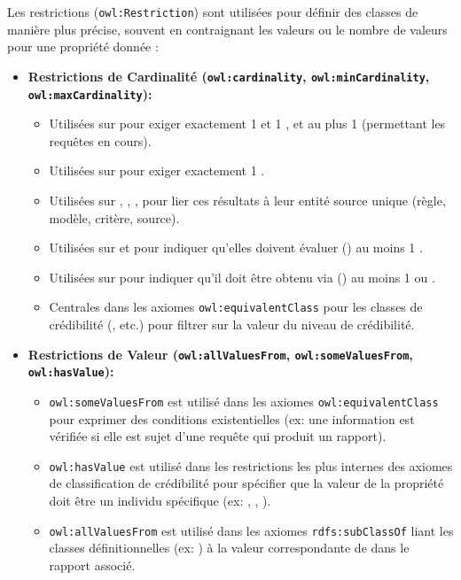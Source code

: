 \documentclass[9pt,twocolumn,twoside,french]{article}
\begin{document}
Les restrictions (\texttt{owl:Restriction}) sont utilisées pour définir des classes de manière plus précise, souvent en contraignant les valeurs ou le nombre de valeurs pour une propriété donnée :
\begin{itemize}
    \item \textbf{Restrictions de Cardinalité (\texttt{owl:cardinality}, \texttt{owl:minCardinality}, \texttt{owl:maxCardinality}):}
        \begin{itemize}
            \item Utilisées sur  pour exiger exactement 1  et 1 , et au plus 1  (permettant les requêtes en cours).
            \item Utilisées sur  pour exiger exactement 1 .
            \item Utilisées sur , , ,  pour lier ces résultats à leur entité source unique (règle, modèle, critère, source).
            \item Utilisées sur  et  pour indiquer qu'elles doivent évaluer () au moins 1 .
            \item Utilisées sur  pour indiquer qu'il doit être obtenu via () au moins 1  ou .
            \item Centrales dans les axiomes \texttt{owl:equivalentClass} pour les classes de crédibilité (, etc.) pour filtrer sur la valeur du niveau de crédibilité.
        \end{itemize}
    \item \textbf{Restrictions de Valeur (\texttt{owl:allValuesFrom}, \texttt{owl:someValuesFrom}, \texttt{owl:hasValue}):}
        \begin{itemize}
            \item \texttt{owl:someValuesFrom} est utilisé dans les axiomes \texttt{owl:equivalentClass} pour exprimer des conditions existentielles (ex: une information est vérifiée si elle est sujet d'une requête qui produit un rapport).
            \item \texttt{owl:hasValue} est utilisé dans les restrictions les plus internes des axiomes de classification de crédibilité pour spécifier que la valeur de la propriété  doit être un individu spécifique (ex: , , ).
            \item \texttt{owl:allValuesFrom} est utilisé dans les axiomes \texttt{rdfs:subClassOf} liant les classes définitionnelles (ex: ) à la valeur correspondante de  dans le rapport associé.
        \end{itemize}
\end{itemize}
\end{document}
